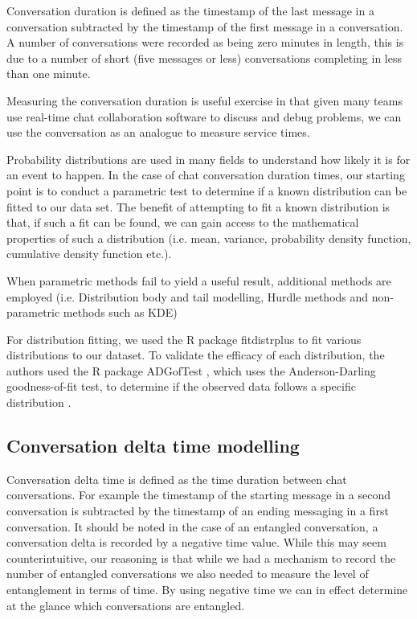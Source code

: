 \documentclass[conference]{IEEEtran}
\begin{document}
Conversation duration is defined as the timestamp of the last message in a conversation subtracted by the timestamp of the first message in a conversation. A number of conversations were recorded as being zero minutes in length, this is due to a number of short (five messages or less) conversations completing in less than one minute. 


Measuring the conversation duration is useful exercise in that given many teams use real-time chat collaboration software to discuss and debug problems, we can use the conversation as an analogue to measure service times.

Probability distributions are used in many fields to understand how likely it is for an event to happen. In the case of chat conversation duration times, our starting point is to conduct a parametric test to determine if a known distribution can be fitted to our data set. The benefit of attempting to fit a known distribution is that, if such a fit can be found, we can gain access to the mathematical properties of such a distribution (i.e. mean, variance, probability density function, cumulative density function etc.). 

When parametric methods fail to yield a useful result, additional methods are employed (i.e. Distribution body and tail modelling, Hurdle methods and non-parametric methods such as KDE)

For distribution fitting, we used the R package fitdistrplus \cite{fitdistrplus} to fit various distributions to our dataset. To validate the efficacy of each distribution,  the authors used the R package ADGofTest \cite{ADGoF}, which uses the Anderson-Darling goodness-of-fit test, to determine if the observed data follows a specific distribution \cite {anderson1952asymptotic}.

\subsection{Conversation delta time modelling}

Conversation delta time is defined as the time duration between chat conversations. For example the timestamp of the starting message in a second conversation is subtracted by the timestamp of an ending messaging in a first conversation. It should be noted in the case of an entangled conversation,  a conversation delta is recorded by a negative time value. While this may seem counterintuitive, our reasoning is that while we had a mechanism to record the number of entangled conversations we also needed to measure the level of entanglement in terms of time. By using negative time we can in effect determine at the glance which conversations are entangled.
\end{document}
